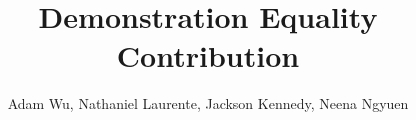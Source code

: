 \documentclass{article}
\begin{document}
\title{Demonstration Equality Contribution}
\author{Adam Wu, Nathaniel Laurente, Jackson Kennedy, Neena Ngyuen}
\maketitle





















\end{document}
